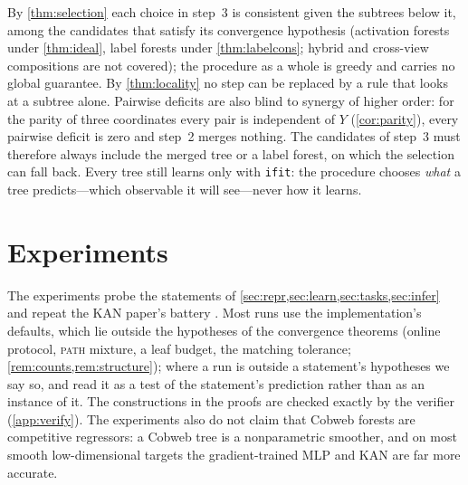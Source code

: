 \documentclass[11pt]{article}
\theoremstyle{definition}
\theoremstyle{remark}
\begin{document}
By \cref{thm:selection} each choice in step~3 is consistent given the subtrees below it,
among the candidates that satisfy its convergence hypothesis (activation forests under
\cref{thm:ideal}, label forests under \cref{thm:labelcons}; hybrid and cross-view
compositions are not covered);
the procedure as a whole is greedy and carries no global guarantee.  By
\cref{thm:locality} no step can be replaced by a rule that looks at a subtree alone.
Pairwise deficits are also blind to synergy of higher order: for the parity of three
coordinates every pair is independent of $Y$ (\cref{cor:parity}), every pairwise deficit
is zero and step~2 merges nothing.  The candidates of step~3 must therefore always
include the merged tree or a label forest, on which the selection can fall back.
Every tree still learns only with \texttt{ifit}: the procedure chooses \emph{what} a tree
predicts---which observable it will see---never how it learns.

\section{Experiments}\label{sec:experiments}

The experiments probe the statements of \cref{sec:repr,sec:learn,sec:tasks,sec:infer}
and repeat the KAN paper's battery \citep{liu2024kan}.  Most runs use the
implementation's defaults, which lie outside the hypotheses of the convergence
theorems (online protocol, \textsc{path} mixture, a leaf budget, the matching tolerance;
\cref{rem:counts,rem:structure}); where a run is outside a statement's hypotheses we say
so, and read it as a test of the statement's prediction rather than as an instance of it.
The constructions in the proofs are checked exactly by the verifier (\cref{app:verify}).
The experiments also do not claim that Cobweb forests are competitive regressors: a
Cobweb tree is a nonparametric smoother, and on most smooth low-dimensional targets the
gradient-trained MLP and KAN are far more accurate.
\end{document}
